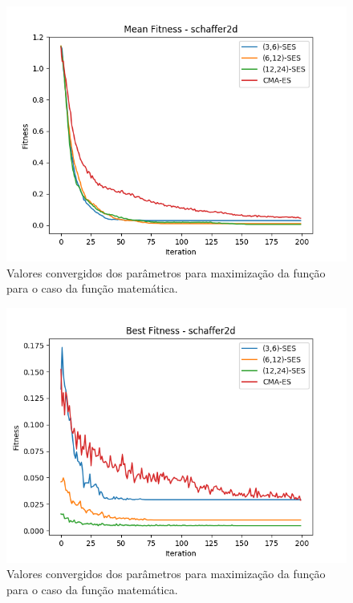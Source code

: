 \documentclass[conference]{IEEEtran}
\begin{document}
\begin{figure}[htbp]
\centering
\centerline{\includegraphics[scale=0.4]{imagens/schaffer2d/mean_fitness.png}}
\caption{Valores convergidos dos parâmetros para maximização da função para o caso da função matemática.}
\label{schaffer2d/mean_fitness}
\end{figure}

\begin{figure}[htbp]
\centering
\centerline{\includegraphics[scale=0.4]{imagens/schaffer2d/best_fitness.png}}
\caption{Valores convergidos dos parâmetros para maximização da função para o caso da função matemática.}
\label{schaffer2d/best_fitness}
\end{figure}
\end{document}
